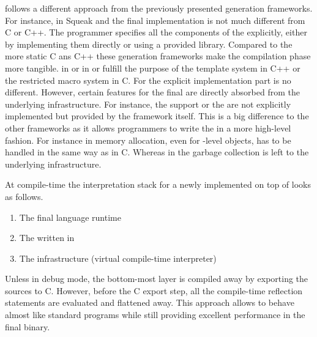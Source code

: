 \PyPy follows a different approach from the previously presented \VM generation frameworks.
For instance, in Squeak and \Jikes the final \VM implementation is not much different from C or C++.
The programmer specifies all the components of the \VM explicitly, either by implementing them directly or using a provided library.
Compared to the more static C ans C++ these \VM generation frameworks make the compilation phase more tangible.
\ST in \Squeak or \Java in \Jikes or \Maxine fulfill the purpose of the template system in C++ or the restricted macro system in C.
For the explicit implementation part \PyPy is no different.
However, certain features for the final \VM are directly absorbed from the underlying \PyPy infrastructure.
For instance, the \JIT support or the \GC are not explicitly implemented but provided by the \PyPy framework itself.
This is a big difference to the other \VM frameworks as it allows programmers to write the \VM in a more high-level fashion.
For instance in \Squeak memory allocation, even for \VM-level objects, has to be handled in the same way as in C.
Whereas in \PyPy the garbage collection is left to the underlying infrastructure.

At compile-time the interpretation stack for a newly implemented \VM on top of \PyPy looks as follows.
%
\begin{enumerate}
\item The final language runtime
\item The \VM written in \RPython
\item The \PyPy infrastructure (virtual compile-time \RPython interpreter)
\end{enumerate}
%
Unless in debug mode, the bottom-most layer is compiled away by exporting the \RPython sources to C.
However, before the C export step, all the compile-time reflection statements are evaluated and flattened away.
This approach allows \RPython \VMs to behave almost like standard \Python programs while still providing excellent performance in the final \VM binary.

